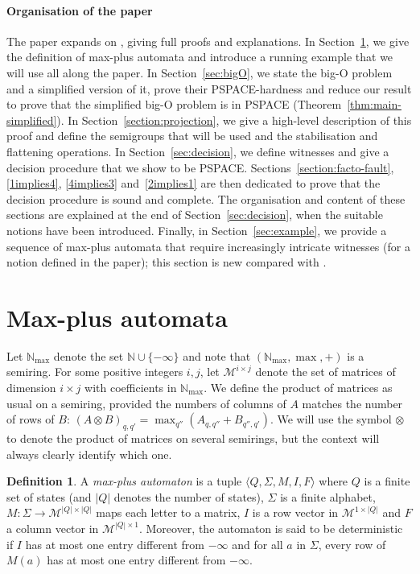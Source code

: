 \documentclass[10pt,a4paper]{amsart}
\theoremstyle{definition}
\newtheorem{defi}[defi]{Definition}
\numberwithin{equation}{section}
\theoremstyle{remark}
\newcommand{\N}{\mathbb{N}}
\newcommand{\Nmax}{\N_{\max}}
\newcommand{\matrices}[2]{\mathcal{M}^{#1 \times #2}}
\theoremstyle{remark}
\begin{document}
\paragraph*{Organisation of the paper} The paper expands on \cite{DaviaudP23}, giving full proofs and explanations. In Section~\ref{sec:mpa}, we give the definition of max-plus automata and introduce a running example that we will use all along the paper. In Section~\ref{sec:bigO}, we state the big-O problem and a simplified version of it, prove their PSPACE-hardness and reduce our result to prove that the simplified big-O problem is in PSPACE (Theorem~\ref{thm:main-simplified}). In Section~\ref{section:projection}, we give a high-level description of this proof and define the semigroups that will be used and the stabilisation and flattening operations. In Section~\ref{sec:decision}, we define witnesses and give a decision procedure that we show to be PSPACE. Sections~\ref{section:facto-fault}, \ref{1implies4}, \ref{4implies3} and~\ref{2implies1} are then dedicated to prove that the decision procedure is sound and complete. The organisation and content of these sections are explained at the end of Section~\ref{sec:decision}, when the suitable notions have been introduced. Finally, in Section~\ref{sec:example}, we provide a sequence of max-plus automata that require increasingly intricate witnesses (for a notion defined in the paper); this section is new compared with \cite{DaviaudP23}.


\section{Max-plus automata}
\label{sec:mpa}

Let $\Nmax$ denote the set $\N \cup \{-\infty\}$ and note that $(\Nmax, \max, +)$ is a semiring. For some positive integers $i,j$, let $\matrices{i}{j}$ denote the set of matrices of dimension $i \times j$ with coefficients in $\Nmax$. We define the product of matrices as usual on a semiring, provided the numbers of columns of $A$ matches the number of rows of $B$: $(A\otimes B)_{q,q'} = \max_{q''} \left(A_{q,q''} + B_{q'',q'}\right)$. We will use the symbol $\otimes$ to denote the product of matrices on several semirings, but the context will always clearly identify which one.
\begin{defi}
A \emph{max-plus automaton} is a tuple $\langle Q, \Sigma, M, I, F\rangle$ where $Q$ is a finite set of states (and $|Q|$ denotes the number of states), $\Sigma$ is a finite alphabet, $M: \Sigma \to \matrices{|Q|}{|Q|}$ maps each letter to a matrix, $I$ is a row vector in $\matrices{1}{|Q|}$ and $F$ a column vector in $\matrices{|Q|}{1}$. Moreover, the automaton is said to be deterministic if $I$ has at most one entry different from $-\infty$ and for all $a$ in $\Sigma$, every row of $M(a)$ has at most one entry different from $-\infty$.
\end{defi}
\end{document}
